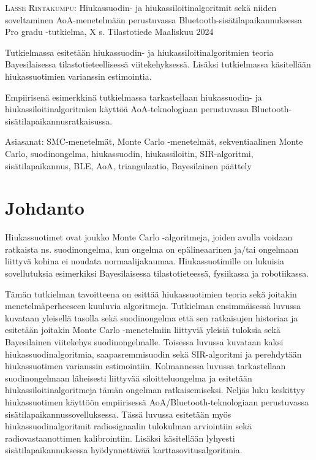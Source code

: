 \documentclass[
  12pt,
  a4paper, twoside]{book}
\newcommand{\tekija}{{Lasse Rintakumpu}}
\newcommand{\otsikko}{{Hiukassuodin- ja hiukassiloitinalgoritmit sekä niiden soveltaminen AoA-menetelmään perustuvassa Bluetooth-sisätilapaikannuksessa}}
\newcommand{\tutkielma}{{Pro gradu }}
\newcommand{\aika}{{Maaliskuu 2024}}
\newcommand{\paaaine}{{Tilastotiede}}
\begin{document}
\noindent \textsc{\tekija}: \otsikko \newline
\tutkielma-tutkielma, X s. \newline
\paaaine \newline
\aika
\par\noindent{\rule{\textwidth}{.2mm}} \newline


\vspace{4mm}\noindent Tutkielmassa esitetään hiukassuodin- ja hiukassiloitinalgoritmien teoria Bayesilaisessa tilastotieteellisessä viitekehyksessä. Lisäksi tutkielmassa käsitellään hiukassuotimien varianssin estimointia.

\vspace{4mm}\noindent Empiirisenä esimerkkinä tutkielmassa tarkastellaan hiukassuodin- ja hiukassiloitinalgoritmien käyttöä AoA-teknologiaan perustuvassa Bluetooth-sisätilapaikannusratkaisussa.

\vspace{4mm}\noindent Asiasanat: SMC-menetelmät, Monte Carlo -menetelmät, sekventiaalinen Monte Carlo, suodinongelma, hiukassuodin, hiukassiloitin, SIR-algoritmi, sisätilapaikannus, BLE, AoA, triangulaatio, Bayesilainen päättely

\cleardoublepage

\cleardoublepage

\pagestyle{plain} 

{
\hypersetup{linkcolor=blue}
\setcounter{tocdepth}{2}
\tableofcontents
}
\setlength\parindent{24pt}
\setlength\parskip{3pt}

\chapter{Johdanto}

Hiukassuotimet ovat joukko Monte Carlo -algoritmeja, joiden avulla voidaan ratkaista ns. suodinongelma, kun ongelma on epälineaarinen ja/tai ongelmaan liittyvä kohina ei noudata normaalijakaumaa. Hiukassuotimille on lukuisia sovellutuksia esimerkiksi Bayesilaisessa tilastotieteessä, fysiikassa ja robotiikassa.

Tämän tutkielman tavoitteena on esittää hiukassuotimien teoria sekä joitakin menetelmäperheeseen kuuluvia algoritmeja. Tutkielman ensimmäisessä luvussa kuvataan yleisellä tasolla sekä suodinongelma että sen ratkaisujen historiaa ja esitetään joitakin Monte Carlo -menetelmiin liittyviä yleisiä tuloksia sekä Bayesilainen viitekehys suodinongelmalle. Toisessa luvussa kuvataan kaksi hiukassuodinalgoritmia, saapasremmisuodin sekä SIR-algoritmi ja perehdytään hiukassuotimen varianssin estimointiin. Kolmannessa luvussa tarkastellaan suodinongelmaan läheisesti liittyvää siloitteluongelma ja esitetään hiukassiloitinalgoritmeja tämän ongelman ratkaisemiseksi. Neljäs luku keskittyy hiukassuotimen käyttöön empiirisessä AoA/Bluetooth-teknologiaan perustuvassa sisätilapaikannussovelluksessa. Tässä luvussa esitetään myös hiukassuodinalgoritmit radiosignaalin tulokulman arviointiin sekä radiovastaanottimen kalibrointiin. Lisäksi käsitellään lyhyesti sisätilapaikannuksessa hyödynnettävää karttasovitusalgoritmia.
\end{document}
